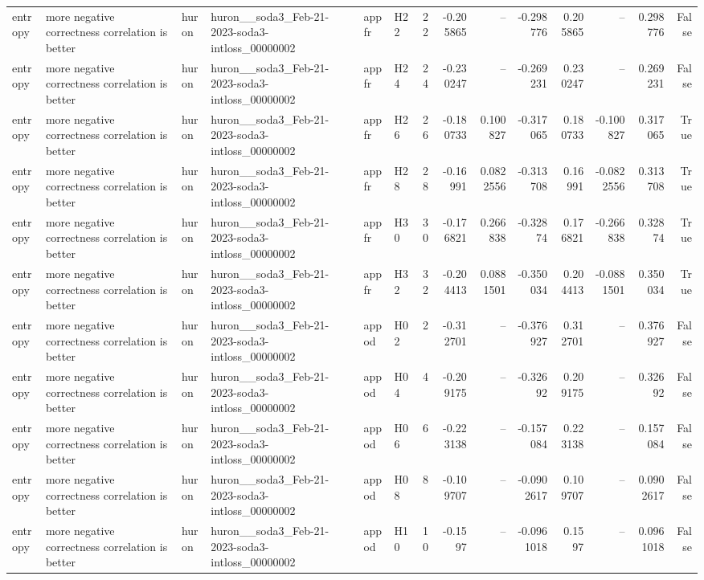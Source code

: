 \begin{longtable}{llllllrrrrrrrr}
entropy & more negative correctness correlation is better & huron & huron\_\_soda3\_Feb-21-2023-soda3-intloss\_00000002 & appfr & H22 & 22 & -0.205865 & -- & -0.298776 & 0.205865 & -- & 0.298776 & False \\
entropy & more negative correctness correlation is better & huron & huron\_\_soda3\_Feb-21-2023-soda3-intloss\_00000002 & appfr & H24 & 24 & -0.230247 & -- & -0.269231 & 0.230247 & -- & 0.269231 & False \\
entropy & more negative correctness correlation is better & huron & huron\_\_soda3\_Feb-21-2023-soda3-intloss\_00000002 & appfr & H26 & 26 & -0.180733 & 0.100827 & -0.317065 & 0.180733 & -0.100827 & 0.317065 & True \\
entropy & more negative correctness correlation is better & huron & huron\_\_soda3\_Feb-21-2023-soda3-intloss\_00000002 & appfr & H28 & 28 & -0.16991 & 0.0822556 & -0.313708 & 0.16991 & -0.0822556 & 0.313708 & True \\
entropy & more negative correctness correlation is better & huron & huron\_\_soda3\_Feb-21-2023-soda3-intloss\_00000002 & appfr & H30 & 30 & -0.176821 & 0.266838 & -0.32874 & 0.176821 & -0.266838 & 0.32874 & True \\
entropy & more negative correctness correlation is better & huron & huron\_\_soda3\_Feb-21-2023-soda3-intloss\_00000002 & appfr & H32 & 32 & -0.204413 & 0.0881501 & -0.350034 & 0.204413 & -0.0881501 & 0.350034 & True \\
entropy & more negative correctness correlation is better & huron & huron\_\_soda3\_Feb-21-2023-soda3-intloss\_00000002 & appod & H02 & 2 & -0.312701 & -- & -0.376927 & 0.312701 & -- & 0.376927 & False \\
entropy & more negative correctness correlation is better & huron & huron\_\_soda3\_Feb-21-2023-soda3-intloss\_00000002 & appod & H04 & 4 & -0.209175 & -- & -0.32692 & 0.209175 & -- & 0.32692 & False \\
entropy & more negative correctness correlation is better & huron & huron\_\_soda3\_Feb-21-2023-soda3-intloss\_00000002 & appod & H06 & 6 & -0.223138 & -- & -0.157084 & 0.223138 & -- & 0.157084 & False \\
entropy & more negative correctness correlation is better & huron & huron\_\_soda3\_Feb-21-2023-soda3-intloss\_00000002 & appod & H08 & 8 & -0.109707 & -- & -0.0902617 & 0.109707 & -- & 0.0902617 & False \\
entropy & more negative correctness correlation is better & huron & huron\_\_soda3\_Feb-21-2023-soda3-intloss\_00000002 & appod & H10 & 10 & -0.1597 & -- & -0.0961018 & 0.1597 & -- & 0.0961018 & False \\

\end{longtable}
